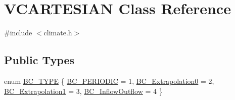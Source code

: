 \hypertarget{class_v_c_a_r_t_e_s_i_a_n}{}\section{V\+C\+A\+R\+T\+E\+S\+I\+AN Class Reference}
\label{class_v_c_a_r_t_e_s_i_a_n}


{\ttfamily \#include $<$climate.\+h$>$}

\subsection*{Public Types}
\begin{DoxyCompactItemize}
\item 
enum \hyperlink{class_v_c_a_r_t_e_s_i_a_n_aec9ac3665c04ce23f9585c8e2de056f6}{B\+C\+\_\+\+T\+Y\+PE} \{ \hyperlink{class_v_c_a_r_t_e_s_i_a_n_aec9ac3665c04ce23f9585c8e2de056f6ad0f60a9b7b408f4d2d52a462fe7eaf58}{B\+C\+\_\+\+P\+E\+R\+I\+O\+D\+IC} = 1, 
\hyperlink{class_v_c_a_r_t_e_s_i_a_n_aec9ac3665c04ce23f9585c8e2de056f6ae67858be0b65cbb0d345a7ba947669b8}{B\+C\+\_\+\+Extrapolation0} = 2, 
\hyperlink{class_v_c_a_r_t_e_s_i_a_n_aec9ac3665c04ce23f9585c8e2de056f6acc38725cbb8a988032aa0aa5fcdebd69}{B\+C\+\_\+\+Extrapolation1} = 3, 
\hyperlink{class_v_c_a_r_t_e_s_i_a_n_aec9ac3665c04ce23f9585c8e2de056f6a1060b021d81999beb1dc430b82164dca}{B\+C\+\_\+\+Inflow\+Outflow} = 4
 \}
\end{DoxyCompactItemize}
